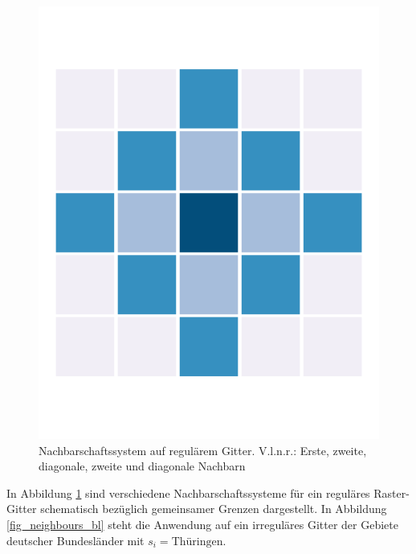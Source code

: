 \begin{figure}
\begin{minipage}[b]{.22\linewidth}
       \includegraphics[width=\linewidth,trim={0.7cm 2.2cm 0.7cm 2.2cm},clip]{body/figures/64-nb_zd.pdf}
    \end{minipage}
    \caption[Nachbarschaftssysteme]{Nachbarschaftssystem auf regulärem Gitter. V.l.n.r.: Erste, zweite, 
    diagonale, zweite und diagonale Nachbarn}
    \label{fig_neighbours}
 \end{figure}


In Abbildung \ref{fig_neighbours} sind verschiedene Nachbarschaftssysteme für ein reguläres 
Raster-Gitter schematisch bezüglich gemeinsamer Grenzen dargestellt. 
In Abbildung \ref{fig_neighbours_bl} steht die Anwendung auf ein 
irreguläres Gitter der Gebiete deutscher Bundesländer mit $s_i=\text{Thüringen}$.\\

